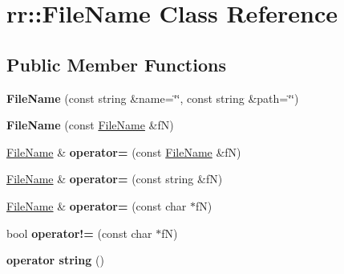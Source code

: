 \hypertarget{classrr_1_1_file_name}{\section{rr\-:\-:File\-Name Class Reference}
\label{classrr_1_1_file_name}
}
\subsection*{Public Member Functions}
\begin{DoxyCompactItemize}
\item 
\hypertarget{classrr_1_1_file_name_abf78ef67916f46e2d733119d7e65d60d}{{\bfseries File\-Name} (const string \&name=\char`\"{}\char`\"{}, const string \&path=\char`\"{}\char`\"{})}\label{classrr_1_1_file_name_abf78ef67916f46e2d733119d7e65d60d}

\item 
\hypertarget{classrr_1_1_file_name_af97f930eb2b11b50684866b196394fd8}{{\bfseries File\-Name} (const \hyperlink{classrr_1_1_file_name}{File\-Name} \&f\-N)}\label{classrr_1_1_file_name_af97f930eb2b11b50684866b196394fd8}

\item 
\hypertarget{classrr_1_1_file_name_a9b8f3e4cda41fe7c58fb5d8d9e88c908}{\hyperlink{classrr_1_1_file_name}{File\-Name} \& {\bfseries operator=} (const \hyperlink{classrr_1_1_file_name}{File\-Name} \&f\-N)}\label{classrr_1_1_file_name_a9b8f3e4cda41fe7c58fb5d8d9e88c908}

\item 
\hypertarget{classrr_1_1_file_name_ac0a9d43cc3e273b246757a416fa72b8b}{\hyperlink{classrr_1_1_file_name}{File\-Name} \& {\bfseries operator=} (const string \&f\-N)}\label{classrr_1_1_file_name_ac0a9d43cc3e273b246757a416fa72b8b}

\item 
\hypertarget{classrr_1_1_file_name_af1ed71fe9ea04d5c6275debbdfc8ac13}{\hyperlink{classrr_1_1_file_name}{File\-Name} \& {\bfseries operator=} (const char $\ast$f\-N)}\label{classrr_1_1_file_name_af1ed71fe9ea04d5c6275debbdfc8ac13}

\item 
\hypertarget{classrr_1_1_file_name_ac34b2cb59e614f1ef85116523293d516}{bool {\bfseries operator!=} (const char $\ast$f\-N)}\label{classrr_1_1_file_name_ac34b2cb59e614f1ef85116523293d516}

\item 
\hypertarget{classrr_1_1_file_name_a434f59040ee18bbf0b97455d3b01cd3c}{{\bfseries operator string} ()}\label{classrr_1_1_file_name_a434f59040ee18bbf0b97455d3b01cd3c}


\end{DoxyCompactItemize}
